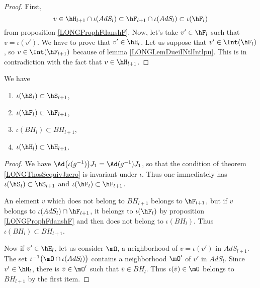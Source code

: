 \begin{proof}
    First,
    \begin{equation}
        v\in\hH_{l+1}\cap\iota(AdS_l)\subset\hF_{l+1}\cap\iota(AdS_l)\subset\iota(\hF_l)
    \end{equation}
    from proposition \ref{LONGProphFdanshF}. Now, let's take $v'\in\hF_l$ such that $v=\iota(v')$. We have to prove that $v'\in\hH_l$. Let us suppose that $v'\in\Int(\hF_l)$, so $v\in\Int(\hF_{l+1})$ because of lemma \ref{LONGLemDueiINtlIntlpu}. This is in contradiction with the fact that $v\in\hH_{l+1}$.
\end{proof}

\begin{corollary}        \label{LONGCorDeuxTrucsBHhH}
    We have
    \begin{multicols}{2}
        \begin{enumerate}

        \item
            $\iota(\hS_l)\subset\hS_{l+1}$,
        \item
            $\iota(\hF_l)\subset\hF_{l+1}$,
        \item
            $\iota(BH_l)\subset BH_{l+1}$,
        \item
            $\iota(\hH_l)\subset \hH_{l+1}$.

        \end{enumerate}
    \end{multicols}
\end{corollary}

\begin{proof}
    We have $\Ad\big( \iota(g^{-1}) \big)J_1=\Ad(g^{-1})J_1$, so that the condition of theorem \eqref{LONGThosSequivJzero} is invariant under $\iota$. Thus one immediately has $\iota(\hS_l)\subset\hS_{l+1}$ and $\iota(\hF_l)\subset\hF_{l+1}$.

    An element $v$ which does not belong to $BH_{l+1}$ belongs to $\hF_{l+1}$, but if $v$ belongs to $\iota(AdS_l)\cap\hF_{l+1}$, it belongs to $\iota(\hF_l)$ by proposition \ref{LONGProphFdanshF} and then does not belong to $\iota(BH_l)$. Thus $\iota(BH_{l})\subset BH_{l+1}$.

    Now if $v'\in\hH_l$, let us consider $\mO$, a neighborhood of $v=\iota(v')$ in $AdS_{l+1}$. The set $\iota^{-1}\big( \mO\cap\iota(AdS_l) \big)$ contains a neighborhood $\mO'$ of $v'$ in $AdS_{l}$. Since $v'\in\hH_l$, there is $\bar v\in\mO'$ such that $\bar v\in BH_l$. Thus $\iota(\bar v)\in\mO$ belongs to $BH_{l+1}$ by the first item.

\end{proof}

